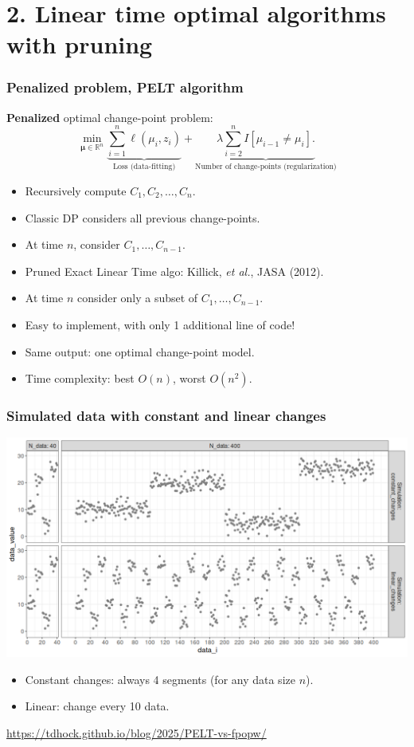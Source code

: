 \documentclass{beamer}
\newcommand{\RR}{\mathbb R}
\begin{document}
\section{2. Linear time optimal algorithms with pruning }

\begin{frame}
  \frametitle{Penalized problem, PELT algorithm}
  \textbf{Penalized} optimal change-point problem:
$$
\min_{
  \mathbf \mu\in\RR^{n}
}
\underbrace{\sum_{i=1}^{n} \ell( \mu_i,  z_i)}_{\text{Loss (data-fitting)}} + \underbrace{\lambda\sum_{i=2}^n I[\mu_{i-1}\neq \mu_i].}_{\text{Number of change-points (regularization)}}
$$
\begin{itemize}
\item Recursively compute $C_{1}, C_2,\dots, C_{n}$.
\item Classic DP considers all previous change-points.
\item At time $n$, consider $C_1,\dots,C_{n-1}$.
\item Pruned Exact Linear Time algo: Killick, \emph{et al.}, JASA (2012).
\item At time $n$ consider only a subset of $C_1,\dots,C_{n-1}$.
\item Easy to implement, with only 1 additional line of code!
\item Same output: one optimal change-point model.
\item Time complexity: best $O(n)$, worst $O(n^2)$.
\end{itemize}
\end{frame}

\begin{frame}
  \frametitle{Simulated data with constant and linear changes}
  \includegraphics[width=\textwidth]{figure-sim-linear-constant-changes.png}

  \begin{itemize}
  \item Constant changes: always 4 segments (for any data size $n$).
  \item Linear: change every 10 data.
  \end{itemize}
  
  \url{https://tdhock.github.io/blog/2025/PELT-vs-fpopw/}
\end{frame}
\end{document}
